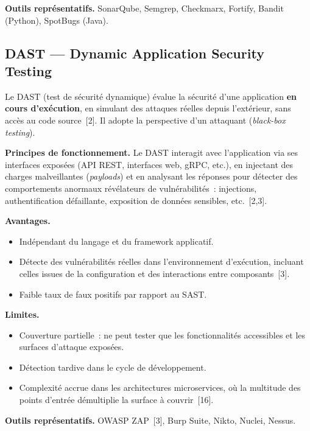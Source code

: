 \textbf{Outils représentatifs.} SonarQube, Semgrep, Checkmarx, Fortify,
Bandit (Python), SpotBugs (Java).

\subsection{DAST --- Dynamic Application Security Testing}

Le DAST (test de sécurité dynamique) évalue la sécurité d'une application
\textbf{en cours d'exécution}, en simulant des attaques réelles depuis
l'extérieur, sans accès au code source~[2]. Il adopte la perspective d'un
attaquant (\emph{black-box testing}).

\textbf{Principes de fonctionnement.} Le DAST interagit avec l'application via
ses interfaces exposées (API REST, interfaces web, gRPC, etc.), en injectant des
charges malveillantes (\emph{payloads}) et en analysant les réponses pour
détecter des comportements anormaux révélateurs de vulnérabilités~: injections,
authentification défaillante, exposition de données sensibles, etc.~[2,3].

\textbf{Avantages.}
\begin{itemize}[leftmargin=*, topsep=2pt, itemsep=1pt]
  \item Indépendant du langage et du framework applicatif.
  \item Détecte des vulnérabilités réelles dans l'environnement d'exécution,
    incluant celles issues de la configuration et des interactions entre
    composants~[3].
  \item Faible taux de faux positifs par rapport au SAST.
\end{itemize}

\textbf{Limites.}
\begin{itemize}[leftmargin=*, topsep=2pt, itemsep=1pt]
  \item Couverture partielle~: ne peut tester que les fonctionnalités
    accessibles et les surfaces d'attaque exposées.
  \item Détection tardive dans le cycle de développement.
  \item Complexité accrue dans les architectures microservices, où la multitude
    des points d'entrée démultiplie la surface à couvrir~[16].
\end{itemize}

\textbf{Outils représentatifs.} OWASP ZAP~[3], Burp Suite, Nikto, Nuclei,
Nessus.

